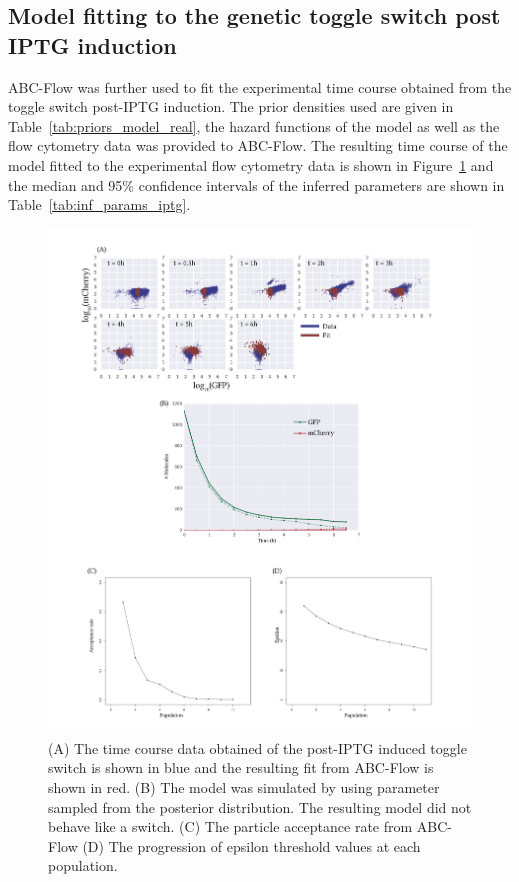 \clearpage
\subsection{Model fitting to the genetic toggle switch post IPTG induction}
ABC-Flow was further used to fit the experimental time course obtained from the toggle switch post-IPTG induction. The prior densities used are given in Table~\ref{tab:priors_model_real}, the hazard functions of the model as well as the flow cytometry data was provided to ABC-Flow. The resulting time course of the model fitted to the experimental flow cytometry data is shown in Figure~\ref{fig:1d-real-res-iptg} and the median and 95\% confidence intervals of the inferred parameters are shown in Table~\ref{tab:inf_params_iptg}.


\begin{figure}[htbp]
\centerfloat%
	\includegraphics[width=1.2\textwidth]{../../chapters/chapterABCFlow/images/2D_real_res_IPTG.png}
	\caption[ABC-Flow fit to post-\acrshort{atc} time course data]{\label{fig:1d-real-res-iptg} (A) The time course data obtained of the post-IPTG induced toggle switch is shown in blue and the resulting fit from ABC-Flow is shown in red. (B) The model was simulated by using parameter sampled from the posterior distribution. The resulting model did not behave like a switch. (C) The particle acceptance rate from ABC-Flow (D) The progression of epsilon threshold values at each population.  }
\end{figure}

